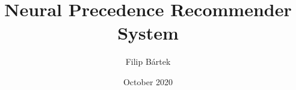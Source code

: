 \usepackage{amsmath}
\usepackage{cleveref}
\usepackage{todonotes}

\usepackage[numbers]{natbib}


\newcommand{\mli}[1]{\mathit{#1}}

\DeclareMathOperator{\re}{\mathbb{R}}
\DeclareMathOperator{\logit}{logit}
\DeclareMathOperator{\sigmoid}{sigmoid}
\newcommand{\inv}[1]{#1^{-1}}

\DeclareMathOperator{\symbols}{\Sigma}
\newcommand{\fv}{\mli{fv}}

\DeclareMathOperator{\Cost}{\mli{c}}
\DeclareMathOperator{\CostSym}{\mli{\Cost_{sym}}}
\DeclareMathOperator{\CostPrec}{\mli{\Cost_{prec}}}
\DeclareMathOperator{\CostPrecPair}{\mli{LogOdds_{pair}}}

\newcommand{\definiendum}[1]{#1}
\newcommand{\vampire}{Vampire}
\newcommand{\frequency}{\texttt{frequency}}
\newcommand{\atping}{automated theorem proving}

\usepackage{glossaries}

\title{Neural Precedence Recommender System}
\author{Filip Bártek}
\date{October 2020}
